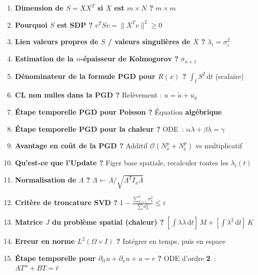 \documentclass[11pt,a4paper]{article}
\begin{document}
\begin{enumerate}[leftmargin=*]
\item \textbf{Dimension de $S=XX^T$ si $X$ est $m\times N$ ?} \hfill $m\times m$

\item \textbf{Pourquoi $S$ est SDP ?} \hfill $v^TSv = \|X^Tv\|^2 \geq 0$

\item \textbf{Lien valeurs propres de $S$ / valeurs singuli\`eres de $X$ ?} \hfill $\lambda_i = \sigma_i^2$

\item \textbf{Estimation de la $n$-\'epaisseur de Kolmogorov ?} \hfill $\sigma_{n+1}$

\item \textbf{D\'enominateur de la formule PGD pour $R(x)$ ?} \hfill $\int_I S^2\,\mathrm{d}t$ (scalaire)

\item \textbf{CL non nulles dans la PGD ?} \hfill Rel\`evement : $u = \tilde{u}+u_g$

\item \textbf{\'Etape temporelle PGD pour Poisson ?} \hfill \'Equation \textbf{alg\'ebrique}

\item \textbf{\'Etape temporelle PGD pour la chaleur ?} \hfill ODE~: $\alpha\dot{\lambda}+\beta\lambda=\gamma$

\item \textbf{Avantage en co\^ut de la PGD ?} \hfill Additif $\mathcal{O}(N_x^p+N_t^p)$ vs multiplicatif

\item \textbf{Qu'est-ce que l'Update ?} \hfill Figer base spatiale, recalculer toutes les $\lambda_i(t)$

\item \textbf{Normalisation de $\Lambda$ ?} \hfill $\Lambda \leftarrow \Lambda/\sqrt{\Lambda^T I_x\Lambda}$

\item \textbf{Crit\`ere de troncature SVD ?} \hfill $1-\frac{\sum_{k=1}^n\sigma_k^2}{\sum\sigma_k^2}\leq\varepsilon$

\item \textbf{Matrice $J$ du probl\`eme spatial (chaleur) ?} \hfill $[\int\lambda\dot{\lambda}\,\mathrm{d}t]\,M + [\int\lambda^2\,\mathrm{d}t]\,K$

\item \textbf{Erreur en norme $L^2(\Omega\times I)$ ?} \hfill Int\'egrer en temps, puis en espace

\item \textbf{\'Etape temporelle pour $\partial_{tt}u+\partial_x u+u=r$ ?} \hfill ODE d'ordre \textbf{2}~: $AT''+BT=\hat{r}$
\end{enumerate}
\end{document}
